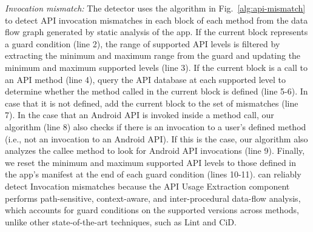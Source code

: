 \textit{Invocation mismatch:} The detector uses
the algorithm in Fig.~\ref{alg:api-mismatch} to detect API invocation
mismatches in each block of each method from the data flow
graph generated by static analysis of the app. If the
current block represents a guard condition (line 2), the
range of supported API levels is filtered by extracting the
minimum and maximum range from the guard and
updating the minimum and maximum supported levels (line 3).
If the current block is a call to an API method (line 4),
query the API database at each supported level to determine
whether the method called in the current block is defined
(line 5-6).  In case that it is not defined, add the current
block to the set of mismatches (line 7).
%
In the case that an Android API is invoked inside a method
call, our algorithm (line 8) also checks if there is an
invocation to a user's defined method (i.e., not an
invocation to an Android API).  If this is the case, our
algorithm also analyzes the callee method  to look
for Android API invocations (line 9).
Finally, we reset the minimum and maximum supported
API levels to those defined in the app's manifest at the end
of each guard condition (lines 10-11).
%
%
%
\@approach can reliably detect Invocation mismatches because
the API Usage Extraction component performs path-sensitive,
context-aware, and inter-procedural data-flow analysis,
which accounts for guard conditions on the
supported versions across methods, unlike other
state-of-the-art techniques, such as {\sc Lint} and {\sc
CiD}.



\begin{figure}[t!]%
        
\end{figure}

